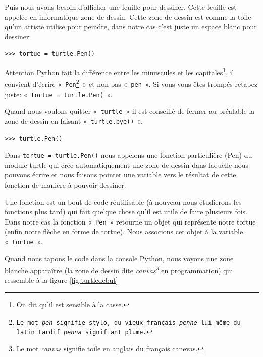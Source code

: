 Puis nous avons besoin d'afficher une feuille pour dessiner. Cette feuille est appelée en informatique zone de dessin. Cette zone de dessin est comme la toile qu'un artiste utilise pour peindre, dans notre cas c'est juste un espace blanc pour dessiner:

\begin{Verbatim}[frame=single,rulecolor=\color{mbleu}, label=à taper]
>>> tortue = turtle.Pen()
\end{Verbatim}

Attention Python fait la différence entre les minuscules et les capitales\footnote{On dit qu'il est sensible à la casse.}, il convient d'écrire «~\texttt{Pen\footnote{Le mot \emph{pen} signifie stylo, du vieux français \emph{penne} lui même du latin tardif \emph{penna} signifiant plume.
}}~»  et non pas «~\texttt{pen}~». Si vous vous êtes trompés retapez juste: «~\texttt{tortue = turtle.Pen(}~».


Quand nous voulons quitter «~\texttt{turtle}~» il est conseillé de fermer au préalable la zone de dessin en faisant «~\texttt{turtle.bye()}~».

\begin{Verbatim}[frame=single,rulecolor=\color{mbleu}, label=à taper]
>>> turtle.Pen()
\end{Verbatim}


Dans \verb+tortue = turtle.Pen()+ nous appelons une fonction particulière (Pen) du module turtle qui crée automatiquement une zone de dessin dans laquelle nous pouvons écrire et nous faisons pointer une variable vers le résultat de cette fonction de manière à pouvoir dessiner.

Une fonction est un bout de code réutilisable (à nouveau nous étudierons  les fonctions plus tard) qui fait quelque chose qu'il est utile de faire plusieurs fois. Dans notre cas la fonction «~\texttt{Pen}~» retourne un objet qui 
représente notre tortue (enfin notre flèche en forme de tortue). Nous associons cet objet à la variable «~\texttt{tortue}~».

Quand nous tapons le code dans la console Python, nous voyons une zone blanche apparaître (la zone de dessin dite \emph{canvas\footnote{Le mot \emph{canvas} signifie toile en anglais du français canevas.}} en programmation) qui ressemble à la figure \ref{fig:turtledebut}

